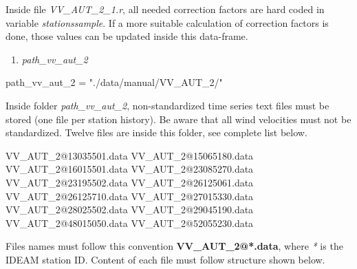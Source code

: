 \documentclass[12pt,oneside]{reedthesis}
\newenvironment{Shaded}{\begin{snugshade}}{\end{snugshade}}
\newcommand{\DecValTok}[1]{\textcolor[rgb]{0.00,0.00,0.81}{#1}}
\newcommand{\ExtensionTok}[1]{#1}
\newcommand{\NormalTok}[1]{#1}
\newcommand{\StringTok}[1]{\textcolor[rgb]{0.31,0.60,0.02}{#1}}
\providecommand{\tightlist}{%
  \setlength{\itemsep}{0pt}\setlength{\parskip}{0pt}}
\begin{document}
Inside file \emph{VV\_AUT\_2\_1.r}, all needed correction factors are hard coded in variable \emph{stationssample}. If a more suitable calculation of correction factors is done, those values can be updated inside this data-frame.
\begin{enumerate}
\def\labelenumi{\arabic{enumi}.}
\setcounter{enumi}{1}
\tightlist
\item
  \emph{path\_vv\_aut\_2}
\end{enumerate}
\scriptsize

\vspace{0.4cm}
\begin{Shaded}
\begin{Highlighting}[]
\NormalTok{      path_vv_aut_}\DecValTok{2}\NormalTok{ =}\StringTok{ "./data/manual/VV_AUT_2/"}
\end{Highlighting}
\end{Shaded}
\normalsize

Inside folder \emph{path\_vv\_aut\_2}, non-standardized time series text files must be stored (one file per station history). Be aware that all wind velocities must not be standardized. Twelve files are inside this folder, see complete list below.

\scriptsize

\vspace{0.4cm}
\begin{Shaded}
\begin{Highlighting}[]
      \ExtensionTok{VV_AUT_2@13035501.data}
      \ExtensionTok{VV_AUT_2@15065180.data}
      \ExtensionTok{VV_AUT_2@16015501.data}
      \ExtensionTok{VV_AUT_2@23085270.data}
      \ExtensionTok{VV_AUT_2@23195502.data}
      \ExtensionTok{VV_AUT_2@26125061.data}
      \ExtensionTok{VV_AUT_2@26125710.data}
      \ExtensionTok{VV_AUT_2@27015330.data}
      \ExtensionTok{VV_AUT_2@28025502.data}
      \ExtensionTok{VV_AUT_2@29045190.data}
      \ExtensionTok{VV_AUT_2@48015050.data}
      \ExtensionTok{VV_AUT_2@52055230.data}
\end{Highlighting}
\end{Shaded}
\normalsize

Files names must follow this convention \textbf{VV\_AUT\_2@*.data}, where \emph{*} is the IDEAM station ID. Content of each file must follow structure shown below.

\scriptsize
\end{document}
